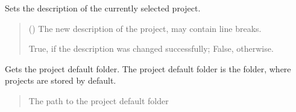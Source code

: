 \documentclass[letterpaper,10pt,english]{sphinxmanual}
\begin{document}
\begin{fulllineitems}
\begin{fulllineitems}
\begin{quote}
\begin{description}
\sphinxAtStartPar
{}

\end{description}\end{quote}

\end{fulllineitems}


\begin{fulllineitems}
\label{\detokenize{apidoc/src.osm_configurator.control:src.osm_configurator.control.settings_controller.SettingsController.set_project_description}}
\pysigstartsignatures
{}
\pysigstopsignatures
\sphinxAtStartPar
Sets the description of the currently selected project.
\begin{quote}\begin{description}
\sphinxAtStartPar
{} () \textendash{} The new description of the project, may contain line breaks.

\sphinxAtStartPar
True, if the description was changed successfully; False, otherwise.

\sphinxAtStartPar
{}

\end{description}\end{quote}

\end{fulllineitems}


\begin{fulllineitems}
\label{\detokenize{apidoc/src.osm_configurator.control:src.osm_configurator.control.settings_controller.SettingsController.get_project_default_folder}}
\pysigstartsignatures
{}
\pysigstopsignatures
\sphinxAtStartPar
Gets the project default folder.
The project default folder is the folder, where projects are stored by default.
\begin{quote}\begin{description}
\sphinxAtStartPar
The path to the project default folder


\end{description}
\end{quote}
\end{fulllineitems}
\end{fulllineitems}
\end{document}
